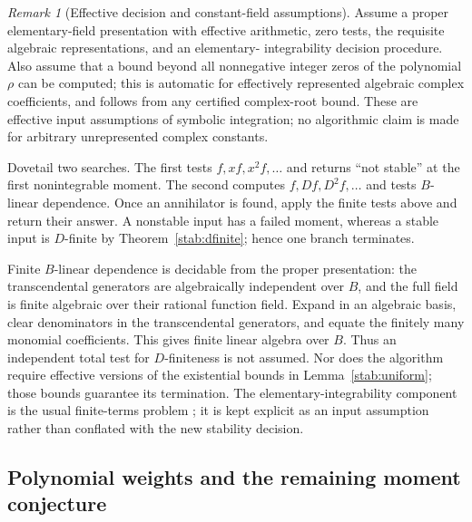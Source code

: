 \documentclass[11pt,a4paper]{article}
\theoremstyle{definition}
\theoremstyle{remark}
\newtheorem{remark}[theorem]{Remark}
\numberwithin{equation}{section}
\begin{document}
\begin{remark}[Effective decision and constant-field assumptions]
\label{stab:algorithm}
Assume a proper elementary-field presentation with effective arithmetic,
zero tests, the requisite algebraic representations, and an elementary-
integrability decision procedure.  Also assume that a bound beyond all
nonnegative integer zeros of the polynomial $\rho$ can be computed;
this is automatic for effectively represented algebraic complex
coefficients, and follows from any certified complex-root bound.
These are effective
input assumptions of symbolic integration; no algorithmic claim is
made for arbitrary unrepresented complex constants.

Dovetail two searches.  The first tests $f,xf,x^2f,\ldots$ and returns
``not stable'' at the first nonintegrable moment.  The second computes
$f,Df,D^2f,\ldots$ and tests $B$-linear dependence.  Once an
annihilator is found, apply the finite tests above and return their
answer.  A nonstable input has a failed moment, whereas a stable input
is $D$-finite by Theorem~\ref{stab:dfinite}; hence one branch terminates.

Finite $B$-linear dependence is decidable from the proper presentation:
the transcendental generators are algebraically independent over $B$,
and the full field is finite algebraic over their rational function
field.  Expand in an algebraic basis, clear denominators in the
transcendental generators, and equate the finitely many monomial
coefficients.  This gives finite linear algebra over $B$.  Thus an
independent total test for $D$-finiteness is not assumed.  Nor does the
algorithm require effective versions of the existential bounds in
Lemma~\ref{stab:uniform}; those bounds guarantee its termination.
The elementary-integrability component is the usual finite-terms
problem \cite{stab:Risch}; it is kept explicit as an input assumption
rather than conflated with the new stability decision.
\end{remark}


\subsection{Polynomial weights and the remaining moment conjecture}
\label{stab:weights-subsection}
\end{document}
